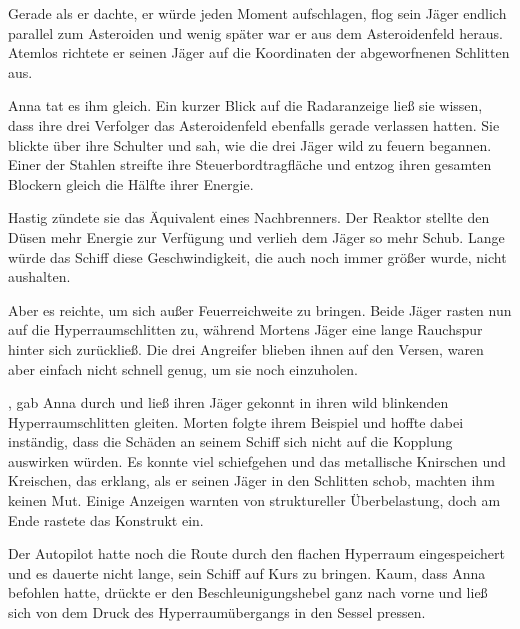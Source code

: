 \par

Gerade als er dachte, er würde jeden Moment aufschlagen, flog sein Jäger endlich parallel zum Asteroiden und wenig später war er aus dem Asteroidenfeld heraus. Atemlos richtete er seinen Jäger auf die Koordinaten der abgeworfnenen Schlitten aus.

\par

Anna tat es ihm gleich. Ein kurzer Blick auf die Radaranzeige ließ sie wissen, dass ihre drei Verfolger das Asteroidenfeld ebenfalls gerade verlassen hatten. Sie blickte über ihre Schulter und sah, wie die drei Jäger wild zu feuern begannen. Einer der Stahlen streifte ihre Steuerbordtragfläche und entzog ihren gesamten Blockern gleich die Hälfte ihrer Energie.

\par

Hastig zündete sie das Äquivalent eines Nachbrenners. Der Reaktor stellte den Düsen mehr Energie zur Verfügung und verlieh dem Jäger so mehr Schub. Lange würde das Schiff diese Geschwindigkeit, die auch noch immer größer wurde, nicht aushalten.

\par

Aber es reichte, um sich außer Feuerreichweite zu bringen. Beide Jäger rasten nun auf die Hyperraumschlitten zu, während Mortens Jäger eine lange Rauchspur hinter sich zurückließ. Die drei Angreifer blieben ihnen auf den Versen, waren aber einfach nicht schnell genug, um sie noch einzuholen.

\par

, gab Anna durch und ließ ihren Jäger gekonnt in ihren wild blinkenden Hyperraumschlitten gleiten. Morten folgte ihrem Beispiel und hoffte dabei inständig, dass die Schäden an seinem Schiff sich nicht auf die Kopplung auswirken würden. Es konnte viel schiefgehen und das metallische Knirschen und Kreischen, das erklang, als er seinen Jäger in den Schlitten schob, machten ihm keinen Mut. Einige Anzeigen warnten von struktureller Überbelastung, doch am Ende rastete das Konstrukt ein.

\par

Der Autopilot hatte noch die Route durch den flachen Hyperraum eingespeichert und es dauerte nicht lange, sein Schiff auf Kurs zu bringen. Kaum, dass Anna  befohlen hatte, drückte er den Beschleunigungshebel ganz nach vorne und ließ sich von dem Druck des Hyperraumübergangs in den Sessel pressen.

